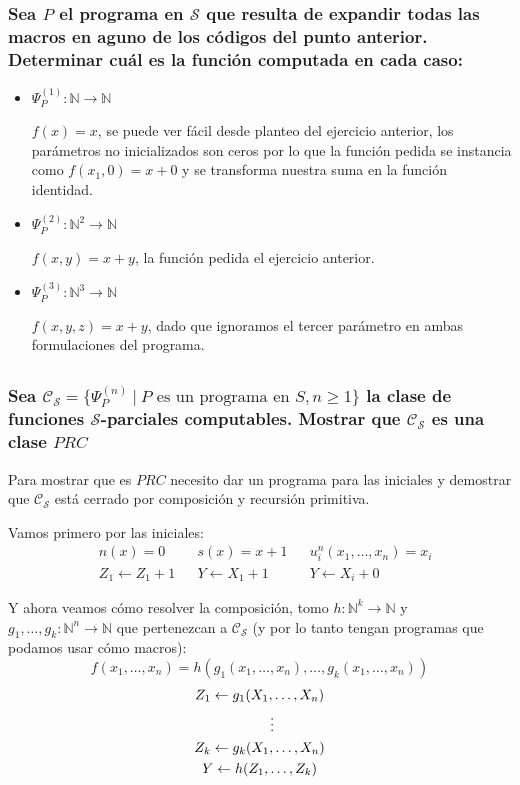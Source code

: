 \documentclass[fleqn, 11pt]{article}
\newcommand{\nat}{\mathbb{N}}
\newcommand{\Ccur}{\mathcal{C}}
\newcommand{\Scur}{\mathcal{S}}
\newcommand{\into}{\leftarrow}
\begin{document}
\subsubsection{Sea $P$ el programa en $\Scur$ que resulta de expandir todas las
macros en aguno de los códigos del punto anterior. Determinar cuál es la
función computada en cada caso:}

\begin{itemize}
	\item $\Psi^{(1)}_P : \nat   \to \nat$
		
		$f(x) = x$, se puede ver fácil desde planteo del ejercicio
		anterior, los parámetros no inicializados son ceros por lo que
		la función pedida se instancia como  $f(x_1, 0) = x + 0$ y se
		transforma nuestra suma en la función identidad.
	\item $\Psi^{(2)}_P : \nat^2 \to \nat$

		$f(x, y) = x + y$, la función pedida el ejercicio anterior.
	\item $\Psi^{(3)}_P : \nat^3 \to \nat$

		$f(x, y, z) = x + y$, dado que ignoramos el tercer parámetro en
		ambas formulaciones del programa.
\end{itemize}

\subsection{}

\subsubsection{Sea $\Ccur_\Scur = \{\Psi^{(n)}_P\ |\ P \text{\ es un programa
en } S, n \geq 1\} $ la clase de funciones $\Scur$-parciales computables.
Mostrar que $\Ccur_\Scur$ es una clase $PRC$}

Para mostrar que es $PRC$ necesito dar un programa para las iniciales y
demostrar que $\Ccur_\Scur$ está cerrado por composición y recursión primitiva.

Vamos primero por las iniciales:
\begin{align*}
	&n(x) = 0 && s(x) = x + 1 && u^n_i(x_1, \dots, x_n) = x_i \\
	&Z_1 \into Z_1 + 1
	&&Y \into X_1 + 1
	&&Y \into X_i + 0
\end{align*}

Y ahora veamos cómo resolver la composición, tomo $h : \nat^k \to \nat$ y
$g_1, \dots, g_k : \nat^n \to \nat$ que pertenezcan a $\Ccur_\Scur$ (y por lo
tanto tengan programas que podamos usar cómo macros):
\[
	f(x_1, \dots, x_n) = h(g_1(x_1, \dots, x_n), \dots,
	                       g_k(x_1, \dots, x_n))
\]
\begin{gather*}
	Z_1 \into g_1(X_1, \dots, X_n) \\
	\hspace{1.8em} \vdots \\
	Z_k \into g_k(X_1, \dots, X_n) \\
	Y   \into h(Z_1, \dots, Z_k)
\end{gather*}
\end{document}
